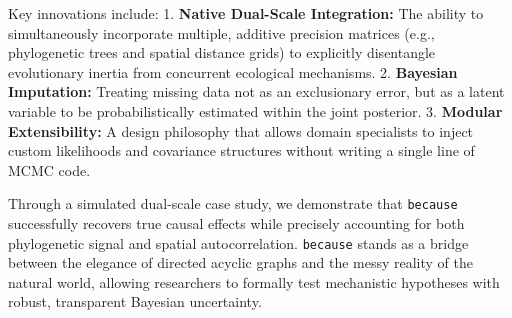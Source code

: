 \documentclass[
]{article}
\begin{document}
Key innovations include:
1. \textbf{Native Dual-Scale Integration:} The ability to simultaneously incorporate multiple, additive precision matrices (e.g., phylogenetic trees and spatial distance grids) to explicitly disentangle evolutionary inertia from concurrent ecological mechanisms.
2. \textbf{Bayesian Imputation:} Treating missing data not as an exclusionary error, but as a latent variable to be probabilistically estimated within the joint posterior.
3. \textbf{Modular Extensibility:} A design philosophy that allows domain specialists to inject custom likelihoods and covariance structures without writing a single line of MCMC code.

Through a simulated dual-scale case study, we demonstrate that \texttt{because} successfully recovers true causal effects while precisely accounting for both phylogenetic signal and spatial autocorrelation. \texttt{because} stands as a bridge between the elegance of directed acyclic graphs and the messy reality of the natural world, allowing researchers to formally test mechanistic hypotheses with robust, transparent Bayesian uncertainty.
\end{document}
